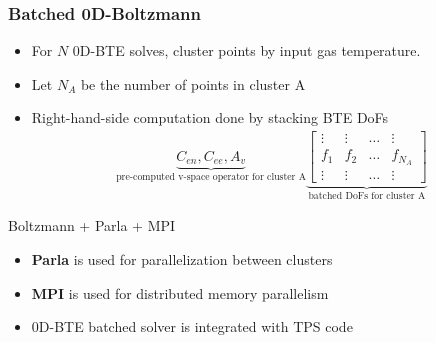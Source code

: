 \documentclass[mathserif, aspectratio=169]{beamer}
\begin{document}


\begin{frame}
	\frametitle{Batched 0D-Boltzmann}
	\begin{itemize}
		\item For $N$ 0D-BTE solves, cluster points by input gas temperature. 
		\item Let $N_A$ be the number of points in cluster A
		\item Right-hand-side computation done by stacking BTE DoFs 
		\begin{align*}
			\underbrace{C_{en}, C_{ee}, A_{v}}_{\text{pre-computed v-space operator for cluster A}} \underbrace{\begin{bmatrix}
				\vdots & \vdots & \hdots &\vdots\\
				f_1    & f_2    & \hdots & f_{N_A} \\
				\vdots & \vdots & \hdots &\vdots
			\end{bmatrix}}_{\text{batched DoFs for cluster A}}
		\end{align*}
	\end{itemize}
	Boltzmann + Parla + MPI
	\begin{itemize}
		\item \textbf{Parla} is used for parallelization between clusters
		\item \textbf{MPI} is used for distributed memory parallelism
		\item 0D-BTE batched solver is integrated with TPS code
	\end{itemize}
\end{frame}
\end{document}
